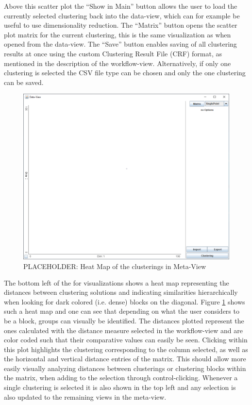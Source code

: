\documentclass[
	a4paper,
	english,
	twoside,
	openright,               
	11pt                            
	]{report}
\begin{document}
Above this scatter plot the ``Show in Main'' button allows the user to load the currently selected clustering back into the data-view, which can for example be useful to use dimensionality reduction. The ``Matrix'' button opens the scatter plot matrix for the current clustering, this is the same visualization as when opened from the data-view. The ``Save'' button enables saving of all clustering results at once using the custom Clustering Result File (CRF) format, as mentioned in the description of the workflow-view. Alternatively, if only one clustering is selected the CSV file type can be chosen and only the one clustering can be saved.

\begin{figure}[h]
	\centering
	\includegraphics[scale=.45]{data-view}
	\caption{PLACEHOLDER: Heat Map of the clusterings in Meta-View}
	\label{fig:heatmap}
\end{figure}

The bottom left of the for visualizations shows a heat map representing the distances between clustering solutions and indicating similarities hierarchically when looking for dark colored (i.e. dense) blocks on the diagonal. Figure \ref{fig:heatmap} shows such a heat map and one can see that depending on what the user considers to be a block, groups can visually be identified. The distances plotted represent the ones calculated with the distance measure selected in the workflow-view and are color coded such that their comparative values can easily be seen. Clicking within this plot highlights the clustering corresponding to the column selected, as well as the horizontal and vertical distance entries of the matrix. This should allow more easily visually analyzing distances between clusterings or clustering blocks within the matrix, when adding to the selection through control-clicking. Whenever a single clustering is selected it is also shown in the top left and any selection is also updated to the remaining views in the meta-view.
\end{document}
